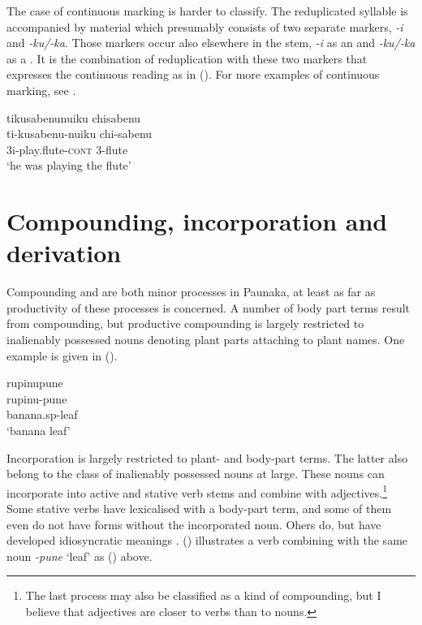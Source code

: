 The case of continuous marking is harder to classify. The reduplicated syllable is accompanied by material which presumably consists of two separate markers, \textit{-i} and \textit{-ku/-ka}. Those markers occur also elsewhere in the stem, \textit{-i} as an  and \textit{-ku/-ka} as a . It is the combination of reduplication with these two markers that expresses the continuous reading as in (). For more examples of continuous marking, see .

\ea\label{ex:FirstRDPL-1}
\begingl
\glpreamble tikusabenunuiku chisabenu\\
\gla ti-kusabenu-nuiku chi-sabenu\\
\glb 3i-play.flute-\textsc{cont} 3-flute\\
\glft ‘he was playing the flute’
\endgl
\trailingcitation{[mox-n110920l.049]}
\xe


\section{Compounding, incorporation and derivation}\label{sec:CompoundingIncorporation}

Compounding and  are both minor processes in Paunaka, at least as far as productivity of these processes is concerned. A number of body part terms result from compounding, but productive compounding is largely restricted to inalienably possessed nouns denoting plant parts attaching to plant names. One example is given in (). 

\ea\label{ex:new23-compound}
\begingl
\glpreamble rupinupune\\
\gla rupinu-pune\\
\glb banana.sp-leaf\\
\glft ‘banana leaf’
\endgl
\trailingcitation{[mxx-e120415ls.053]}
\xe
{}

Incorporation is largely restricted to plant- and body-part terms. The latter also belong to the class of inalienably possessed nouns at large. These nouns can incorporate into active and stative verb stems and combine with adjectives.\footnote{The last process may also be classified as a kind of compounding, but I believe that adjectives are closer to verbs than to nouns.} Some stative verbs have lexicalised with a body-part term, and some of them even do not have forms without the incorporated noun. Ohers do, but have developed idiosyncratic meanings \citep[cf.][]{TerhartDanielsenBODY}. () illustrates a verb combining with the same noun \textit{-pune} ‘leaf’ as () above.

